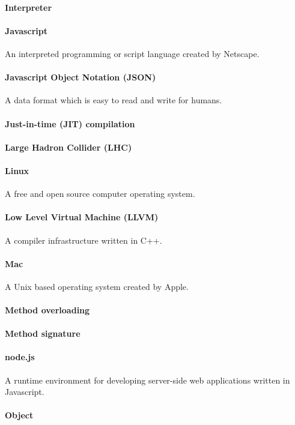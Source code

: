\paragraph{Interpreter}
\paragraph{Javascript}
An interpreted programming or script language created by Netscape.
\paragraph{Javascript Object Notation (JSON)}
A data format which is easy to read and write for humans.
\paragraph{Just-in-time (JIT) compilation}
\paragraph{Large Hadron Collider (LHC)}
\paragraph{Linux}
A free and open source computer operating system.
\paragraph{Low Level Virtual Machine (LLVM)}
A compiler infrastructure written in C++.
\paragraph{Mac}
A Unix based operating system created by Apple.
\paragraph{Method overloading}

\paragraph{Method signature}

\paragraph{node.js}
A runtime environment for developing server-side web applications written in Javascript. 

\paragraph{Object}

